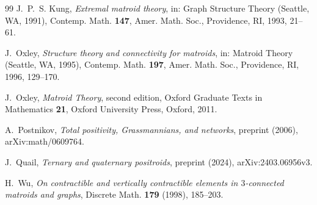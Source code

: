 \documentclass[11pt]{amsart}
\theoremstyle{definition}
\theoremstyle{remark}
\numberwithin{equation}{section}
\begin{document}
\begin{thebibliography}{99}
 J.~P.~S. Kung, \emph{Extremal matroid theory}, in: Graph Structure Theory (Seattle, WA, 1991), Contemp. Math. \textbf{147}, Amer. Math. Soc., Providence, RI, 1993, 21--61.

 J.~Oxley, \emph{Structure theory and connectivity for matroids}, in: Matroid Theory (Seattle, WA, 1995), Contemp. Math. \textbf{197}, Amer. Math. Soc., Providence, RI, 1996, 129--170.

 J.~Oxley, \emph{Matroid Theory}, second edition, Oxford Graduate Texts in Mathematics \textbf{21}, Oxford University Press, Oxford, 2011.

 A.~Postnikov, \emph{Total positivity, Grassmannians, and networks}, preprint (2006), arXiv:math/0609764.

 J.~Quail, \emph{Ternary and quaternary positroids}, preprint (2024), arXiv:2403.06956v3.

 H.~Wu, \emph{On contractible and vertically contractible elements in $3$-connected matroids and graphs}, Discrete Math. \textbf{179} (1998), 185--203.

\end{thebibliography}
\end{document}
